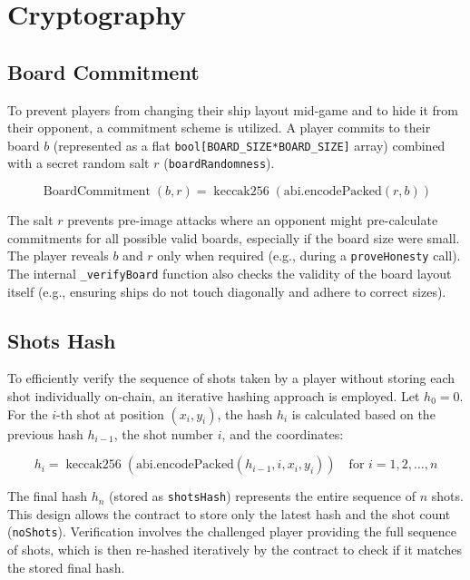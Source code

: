 \documentclass{article}
\begin{document}
    \section{Cryptography}

    \subsection{Board Commitment}
    To prevent players from changing their ship layout mid-game and to hide it from their opponent, a commitment scheme is utilized. A player commits to their board \( b \) (represented as a flat \texttt{bool[BOARD\_SIZE*BOARD\_SIZE]} array) combined with a secret random salt \( r \) (\texttt{boardRandomness}).

    \[ \operatorname{BoardCommitment}(b, r) = \operatorname{keccak256}(\text{abi.encodePacked}(r, b)) \]

    The salt \( r \) prevents pre-image attacks where an opponent might pre-calculate commitments for all possible valid boards, especially if the board size were small. The player reveals \( b \) and \( r \) only when required (e.g., during a \texttt{proveHonesty} call). The internal \texttt{\_verifyBoard} function also checks the validity of the board layout itself (e.g., ensuring ships do not touch diagonally and adhere to correct sizes).

    \subsection{Shots Hash}

    To efficiently verify the sequence of shots taken by a player without storing each shot individually on-chain, an iterative hashing approach is employed. Let \( h_0 = 0 \). For the \( i \)-th shot at position \( (x_i, y_i) \), the hash \( h_i \) is calculated based on the previous hash \( h_{i-1} \), the shot number \( i \), and the coordinates:

    \[ h_i = \operatorname{keccak256}(\text{abi.encodePacked}(h_{i-1}, i, x_i, y_i)) \quad \text{for } i = 1, 2, \ldots, n \]

    The final hash \( h_n \) (stored as \texttt{shotsHash}) represents the entire sequence of \( n \) shots. This design allows the contract to store only the latest hash and the shot count (\texttt{noShots}). Verification involves the challenged player providing the full sequence of shots, which is then re-hashed iteratively by the contract to check if it matches the stored final hash.
\end{document}
